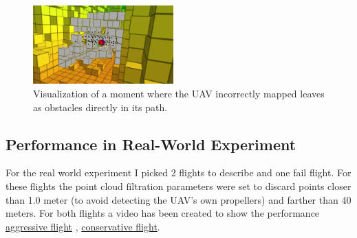             \begin{figure}[H]
                \centering
                \includegraphics[width=0.48\textwidth]{./fig/rviz/deadlock_moment_mapping_gray.png}
                \caption{
                    Visualization of a moment where the \ac{UAV} incorrectly mapped leaves as obstacles directly in its path. 
                }
                \label{fig:map_fail}
            \end{figure}

        
        \subsection{Performance in Real-World Experiment}
            For the real world experiment I picked 2 flights to describe and one fail flight. 
            For these flights the point cloud filtration parameters were set to discard points closer than 1.0 meter (to avoid detecting the \ac{UAV}'s own propellers) and farther than 40 meters.
            For both flights a video has been created to show the performance \href{https://www.youtube.com/watch?v=DFt222gnA_w&ab_channel=MichalKamler}{aggressive flight} \cite{aggressive_flight}, \href{https://www.youtube.com/watch?v=AJPk0yVCPUo&ab_channel=MichalKamler}{conservative flight}\cite{conservative_flight}.
            
